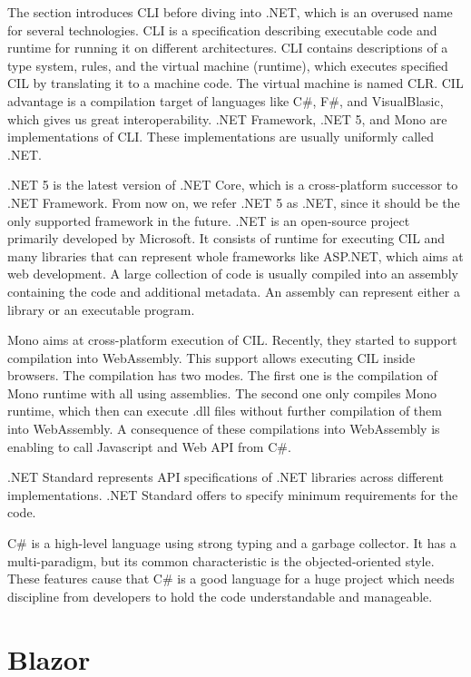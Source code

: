 The section introduces \ac{CLI} \cite{online:cliWiki} before diving into .NET, which is an overused name for several technologies.
CLI is a specification describing executable code and runtime for running it on different architectures.
CLI contains descriptions of a type system, rules, and the virtual machine (runtime), which executes specified \ac{CIL} by translating it to a machine code. 
The virtual machine is named \ac{CLR}.
CIL advantage is a compilation target of languages like C\#, F\#, and VisualBlasic, which gives us great interoperability.
.NET Framework, .NET 5, and Mono are implementations of CLI.
These implementations are usually uniformly called .NET.
\par
.NET 5 \cite{online:netcoreWiki} is the latest version of .NET Core, which is a cross-platform successor to .NET Framework.
From now on, we refer .NET 5 as .NET, since it should be the only supported framework in the future.
.NET is an open-source project primarily developed by Microsoft.
It consists of runtime for executing CIL and many libraries that can represent whole frameworks like ASP.NET, which aims at web development.
A large collection of code is usually compiled into an assembly containing the code and additional metadata.
An assembly can represent either a library or an executable program.
\par
Mono aims at cross-platform execution of CIL. 
Recently, they started to support compilation \cite{online:monoCompilation} into WebAssembly.
This support allows executing CIL inside browsers.
The compilation has two modes.
The first one is the compilation of Mono runtime with all using assemblies.
The second one only compiles Mono runtime, which then can execute .dll files without further compilation of them into WebAssembly.
A consequence of these compilations into WebAssembly is enabling to call Javascript and Web API from C\#.
\par
.NET Standard represents API specifications of .NET libraries across different implementations.
.NET Standard offers to specify minimum requirements for the code.
\par
C\# is a high-level language using strong typing and a garbage collector.
It has a multi-paradigm, but its common characteristic is the objected-oriented style.
These features cause that C\# is a good language for a huge project which needs discipline from developers to hold the code understandable and manageable.

\section{Blazor}

